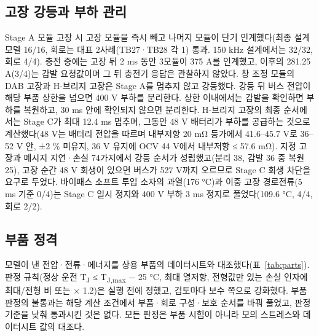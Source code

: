 \documentclass[10pt,a4paper,twocolumn]{article}
\begin{document}
\subsection{고장 강등과 부하 관리}
Stage A 모듈 고장 시 고장 모듈을 즉시 빼고 나머지 모듈이 단기 인계했다(최종 설계 모델 16/16, 회로는 대표 2사례(TB27·TB28 각 1) 통과. 150 kHz 설계에서는 32/32, 회로 4/4). 충전 중에는 고장 뒤 2 ms 동안 3모듈이 375 A를 인계했고, 이후의 281.25 A(3/4)는 감발 요청값이며 그 뒤 충전기 응답은 관찰하지 않았다. 창 조정 모듈의 DAB 고장과 H-브리지 고장은 Stage A를 멈추지 않고 강등했다. 강등 뒤 버스 전압이 해당 부품 상한을 넘으면 400 V 부하를 분리한다. 상한 이내에서는 감발을 확인하면 부하를 복원하고, 30 ms 안에 확인되지 않으면 분리한다. H-브리지 고장의 최종 순서에서는 Stage C가 최대 12.4 ms 멈추며, 그동안 48 V 배터리가 부하를 공급하는 것으로 계산했다(48 V는 배터리 전압을 따르며 내부저항 20 mΩ 등가에서 41.6–45.7 V로 36–52 V 안, ±2 \% 미유지, 36 V 유지에 OCV 44 V에서 내부저항 ≤ 57.6 mΩ). 지정 고장과 메시지 지연·손실 74가지에서 강등 순서가 성립했고(분리 38, 감발 36 중 복원 25), 고장 순간 48 V 회생이 있으면 버스가 527 V까지 오르므로 Stage C 회생 차단을 요구로 두었다. 바이패스 소프트 투입 소자의 과열(176 °C)과 이중 고장 경로전류(5 ms 기준 0/4)는 Stage C 일시 정지와 400 V 부하 3 ms 정지로 풀었다(109.6 °C, 4/4, 회로 2/2).

\subsection{부품 정격}
모델이 낸 전압·전류·에너지를 상용 부품의 데이터시트와 대조했다(표~\ref{tab:parts}). 판정 규칙(정상 운전 T\textsubscript{J} ≤ T\textsubscript{J,max} − 25 °C, 최대 열저항, 전형값만 있는 손실 인자에 최대/전형 비 또는 × 1.2)은 실행 전에 정했고, 검토마다 보수 쪽으로 강화했다. 부품 판정의 불통과는 해당 계산 조건에서 부품·회로 구성·보호 순서를 바꿔 풀었고, 판정 기준을 낮춰 통과시킨 것은 없다. 모든 판정은 부품 시험이 아니라 모의 스트레스와 데이터시트 값의 대조다.
\end{document}
